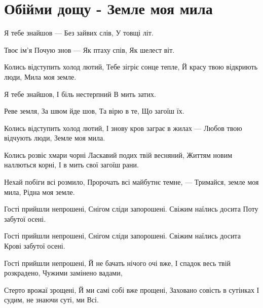 \section{Обійми дощу - Земле моя мила}
\begin{guitar}

Я тебе знайшов —
Без зайвих слів,
У товщі літ.

Твоє ім'я
Почую знов —
Як птаху спів,
Як шелест віт.

Колись відступить холод лютий,
Тебе зігріє сонце тепле,
Й красу твою відкриють люди,
Мила моя земле.

Я тебе знайшов,
І біль нестерпний
В мить затих.

Реве земля,
За швом йде шов,
Та вірю в те,
Що загоїш їх.

Колись відступить холод лютий,
І знову кров заграє в жилах —
Любов твою відчують люди,
Земле моя мила.

Колись розвіє хмари чорні
Ласкавий подих твій весняний,
Життям новим наллються корні,
І в мить свої загоїш рани.

Нехай побіги всі розмило,
Пророчать всі майбутнє темне, —
Тримайся, земле моя мила,
Рідна моя земле.

Гості прийшли непрошені,
Снігом сліди запорошені.
Свіжим наїлись досита
Поту забутої осені.

Гості прийшли непрошені,
Снігом сліди запорошені.
Свіжим наїлись досита
Крові забутої осені.

Гості прийшли непрошені,
Й не бачать нічого очі вже,
І спадок весь твій розкрадено,
Чужими замінено вадами,

Стерто врожаї зрощені,
Й ми самі собі вже прощені,
Заховано совість в сутінках
І судим, не знаючи суті, ми
Всі.
\end{guitar}
